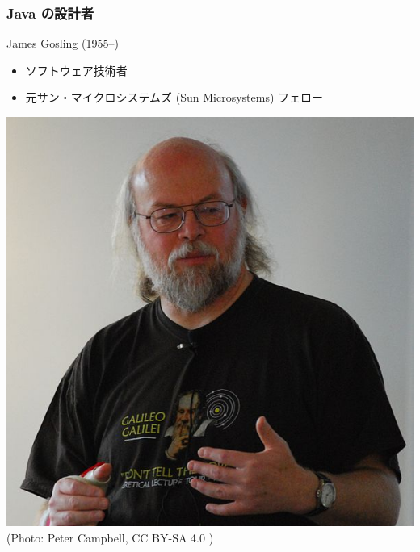 \documentclass[dvipdfmx]{beamer}
\begin{document}
\begin{frame}
    \frametitle{Java の設計者}
    James Gosling (1955--)
    \begin{itemize}
        \item ソフトウェア技術者
        \item 元サン・マイクロシステムズ (Sun Microsystems) フェロー
    \end{itemize}
    \begin{center}
        \includegraphics[scale=0.2]{596px-James_Gosling_2008.jpg}\\
        (Photo: Peter Campbell, CC BY-SA 4.0 \cite{campbell})
    \end{center}
\end{frame}
\end{document}
